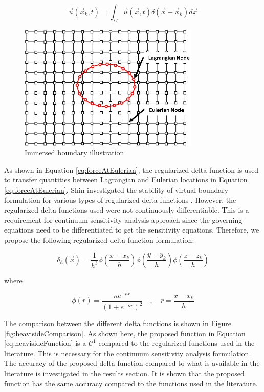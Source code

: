 \documentclass{aiaa-pretty}
\begin{document}
%
\begin{equation}\label{eq:velocityAtLagrangian}
	\vec{u}(\vec{x}_k, t) = \int_\Omega \vec{u} (\vec{x}, t) \delta(\vec{x} - \vec{x}_k) d\vec{x}
\end{equation}
%

%
\begin{figure}[H]
	\centering
	\includegraphics[height=6.0cm]{figure/immerdBoundary.jpg}
	\caption{Immersed boundary illustration}
	\label{fig:immersedBoundary}
\end{figure}
%

As shown in Equation \eqref{eq:forceAtEulerian}, the regularized delta function is used to transfer quantities between Lagrangian and Eulerian locations in Equation \eqref{eq:forceAtEulerian}. Shin investigated the stability of virtual boundary formulation for various types of regularized delta functions \cite{shin2008assessment}. However, the regularized delta functions used were not continuously differentiable. This is a requirement for continuum sensitivity analysis approach since the governing equations need to be differentiated to get the sensitivity equations. Therefore, we propose the following regularized delta function formulation:

%
\begin{equation}\label{eq:heavisideFunction}
	\delta_h(\vec{x}) = \frac{1}{h^3} \phi \left( \frac{x - x_k}{h} \right)
									 \phi \left( \frac{y - y_k}{h} \right)
									 \phi \left( \frac{z - z_k}{h} \right)
\end{equation}
%

where

%
\begin{equation}\label{eq:continuousDeltaFunction}
	\phi(r) = \frac{\kappa e^{-\kappa r}}{\left( 1 + e^{-\kappa r} \right)^2} \quad , \quad r = \frac{x - x_k}{h}
\end{equation}
%

The comparison between the different delta functions is shown in Figure \ref{fig:heavisideComparison}. As shown here, the proposed function in Equation \eqref{eq:heavisideFunction} is a $\mathcal{C}^1$ compared to the regularized functions used in the literature. This is necessary for the continuum sensitivity analysis formulation. The accuracy of the proposed delta function compared to what is available in the literature is investigated in the results section. It is shown that the proposed function has the same accuracy compared to the functions used in the literature.
\end{document}
